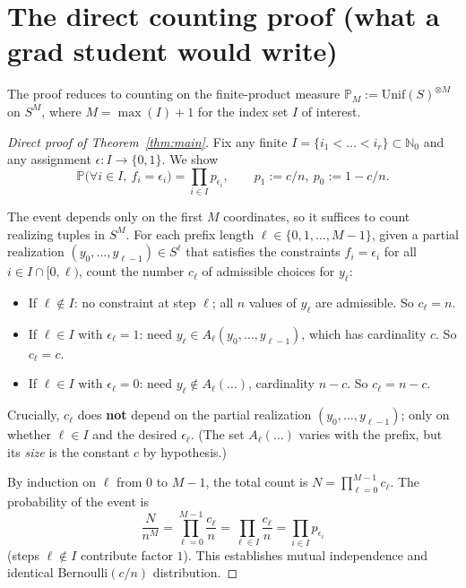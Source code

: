 \documentclass[11pt,a4paper]{article}
\newcommand{\N}{\mathbb{N}}
\newcommand{\Prob}{\mathbb{P}}
\theoremstyle{plain}
\theoremstyle{definition}
\theoremstyle{remark}
\begin{document}
\section{The direct counting proof (what a grad student would write)}

The proof reduces to counting on the finite-product measure
$\Prob_M := \mathrm{Unif}(S)^{\otimes M}$ on $S^M$, where
$M = \max(I) + 1$ for the index set $I$ of interest.

\begin{proof}[Direct proof of Theorem~\ref{thm:main}]
Fix any finite $I = \{i_1 < \dots < i_r\} \subset \N_0$ and any
assignment $\epsilon : I \to \{0, 1\}$. We show
\[
  \Prob\bigl(\forall i \in I,\ f_i = \epsilon_i\bigr)
    = \prod_{i \in I} p_{\epsilon_i},
  \qquad p_1 := c/n,\ p_0 := 1 - c/n.
\]

The event depends only on the first $M$ coordinates, so it suffices
to count realizing tuples in $S^M$. For each prefix length
$\ell \in \{0, 1, \dots, M-1\}$, given a partial realization
$(y_0, \dots, y_{\ell-1}) \in S^\ell$ that satisfies the constraints
$f_i = \epsilon_i$ for all $i \in I \cap [0, \ell)$, count the
number $c_\ell$ of admissible choices for $y_\ell$:
\begin{itemize}
  \item If $\ell \notin I$: no constraint at step $\ell$; all $n$
    values of $y_\ell$ are admissible. So $c_\ell = n$.
  \item If $\ell \in I$ with $\epsilon_\ell = 1$: need $y_\ell \in
    A_\ell(y_0, \dots, y_{\ell-1})$, which has cardinality $c$. So
    $c_\ell = c$.
  \item If $\ell \in I$ with $\epsilon_\ell = 0$: need $y_\ell \notin
    A_\ell(\dots)$, cardinality $n - c$. So $c_\ell = n - c$.
\end{itemize}

Crucially, $c_\ell$ does \textbf{not} depend on the partial realization
$(y_0, \dots, y_{\ell-1})$; only on whether $\ell \in I$ and the
desired $\epsilon_\ell$. (The set $A_\ell(\dots)$ varies with the
prefix, but its \emph{size} is the constant $c$ by hypothesis.)

By induction on $\ell$ from $0$ to $M-1$, the total count is
$N = \prod_{\ell=0}^{M-1} c_\ell$. The probability of the event is
\[
  \frac{N}{n^M} = \prod_{\ell=0}^{M-1} \frac{c_\ell}{n}
    = \prod_{\ell \in I} \frac{c_{\ell}}{n}
    = \prod_{i \in I} p_{\epsilon_i}
\]
(steps $\ell \notin I$ contribute factor $1$). This establishes
mutual independence and identical Bernoulli$(c/n)$ distribution.
\end{proof}
\end{document}
